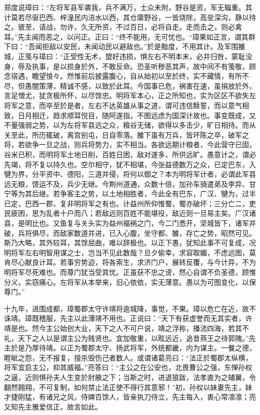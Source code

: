 \documentclass[12pt,UTF8]{ctexbook}
\begin{document}
郑度说璋曰：“左将军县军袭我，兵不满万，士众未附，野谷是资，军无辎重。其计莫若尽驱巴西、梓潼民内涪水以西，其仓廪野谷，一皆烧除，高垒深沟，静以待之。彼至，请战，勿许，久无所资，不过百日，必将自走。走而击之，则必禽耳。”先主闻而恶之，以问正。正曰：“终不能用，无可忧也。“璋果如正言，谓其群下曰：“吾闻拒敌以安民，未闻动民以避敌也。”於是黜度，不用其计。及军围雒城，正笺与璋曰：“正受性无术，盟好违损，惧左右不明本末，必并归咎，蒙耻没身，辱及执事，是以损身於外，不敢反命。恐圣听秽恶其声，故中间不有笺敬，顾念宿遇，瞻望悢々。然惟前后披露腹心，自从始初以至於终，实不藏情，有所不尽，但愚闇策薄，精诚不感，以致於此耳。今国事已危，祸害在速，虽捐放於外，言足憎尤，犹贪极所怀，以尽馀忠。明将军本心，正之所知也，实为区区不欲失左将军之意，而卒至於是者，左右不达英雄从事之道，谓可违信黩誓，而以意气相致，日月相迁，趋求顺耳悦目，随阿遂指，不图远虑为国深计故也。事变既成，又不量强弱之势，以为左将军县远之众，粮谷无储，欲得以多击少，旷日相持。而从关至此，所历辄破，离宫别屯，日自零落。雒下虽有万兵，皆坏陈之卒，破军之将，若欲争一旦之战，则兵将势力，实不相当。各欲远期计粮者，今此营守已固，谷米已积，而明将军土地日削，百姓日困，敌对遂多，所供远旷。愚意计之，谓必先竭，将不复以持久也。空尔相守，犹不相堪，今张益德数万之众，已定巴东，入犍为界，分平资中、德阳，三道并侵，将何以御之？本为明将军计者，必谓此军县远无粮，馈运不及，兵少无继。今荆州道通，众数十倍，加孙车骑遣弟及李异、甘宁等为其后继。若争客主之势，以土地相胜者，今此全有巴东，广汉、犍为，过半已定，巴西一郡，复非明将军之有也。计益州所仰惟蜀，蜀亦破坏；三分亡二，吏民疲困，思为乱者十户而八；若敌远则百姓不能堪役，敌近则一旦易主矣。广汉诸县，是明比也。又鱼复与关头实为益州福祸之门，今二门悉开，坚城皆下，诸军并破，兵将俱尽，而敌家数道并进，已入心腹，坐守都、雒，存亡之势，昭然可见。斯乃大略，其外较耳，其馀屈曲，难以辞极也。以正下愚，犹知此事不可复成，况明将军左右明智用谋之士，岂当不见此数哉？旦夕偷幸，求容取媚，不虑远图，莫肯尽心献良计耳。若事穷势迫，将各索生，求济门户，展转反覆，与今计异，不为明将军尽死难也。而尊门犹当受其忧。正虽获不忠之谤，然心自谓不负圣德，顾惟分义，实窃痛心。左将军从本举来，旧心依依，实无薄意。愚以为可图变化，以保尊门。”

十九年，进围成都，璋蜀郡太守许靖将逾城降，事觉，不果。璋以危亡在近，故不诛靖。璋既稽服，先主以此薄靖不用也。正说曰：“天下有获虚誉而无其实者，许靖是也。然今主公始创大业，天下之人不可户说，靖之浮称，播流四海，若其不礼，天下之人以是谓主公为贱贤也。宜加敬重，以眩远近，追昔燕王之待郭隗。”先主於是乃厚待靖。以正为蜀郡太守、扬武将军，外统都畿，内为谋主。一餐之德，睚眦之怨，无不报复，擅杀毁伤己者数人。或谓诸葛亮曰：“法正於蜀郡太纵横，将军宜启主公，抑其威福。”亮答曰：“主公之在公安也，北畏曹公之强，东惮孙权之逼，近则惧孙夫人生变於肘腋之下；当斯之时，进退狼跋，法孝直为之辅翼，令翻然翱翔，不可复制，如何禁止法正使不得行其意邪！”初，孙权以妹妻先主，妹才捷刚猛，有诸兄之风，侍婢百馀人，皆亲执刀侍立，先主每入，衷心常凛凛；亮又知先主雅爱信正，故言如此。
\end{document}
